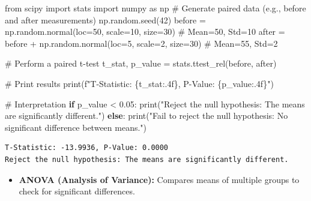 \documentclass[
  letterpaper,
  DIV=11,
  numbers=noendperiod]{scrreprt}
\newenvironment{Shaded}{\begin{snugshade}}{\end{snugshade}}
\newcommand{\BuiltInTok}[1]{\textcolor[rgb]{0.00,0.23,0.31}{#1}}
\newcommand{\CommentTok}[1]{\textcolor[rgb]{0.37,0.37,0.37}{#1}}
\newcommand{\ControlFlowTok}[1]{\textcolor[rgb]{0.00,0.23,0.31}{\textbf{#1}}}
\newcommand{\DecValTok}[1]{\textcolor[rgb]{0.68,0.00,0.00}{#1}}
\newcommand{\FloatTok}[1]{\textcolor[rgb]{0.68,0.00,0.00}{#1}}
\newcommand{\ImportTok}[1]{\textcolor[rgb]{0.00,0.46,0.62}{#1}}
\newcommand{\NormalTok}[1]{\textcolor[rgb]{0.00,0.23,0.31}{#1}}
\newcommand{\OperatorTok}[1]{\textcolor[rgb]{0.37,0.37,0.37}{#1}}
\newcommand{\SpecialCharTok}[1]{\textcolor[rgb]{0.37,0.37,0.37}{#1}}
\newcommand{\SpecialStringTok}[1]{\textcolor[rgb]{0.13,0.47,0.30}{#1}}
\newcommand{\StringTok}[1]{\textcolor[rgb]{0.13,0.47,0.30}{#1}}
\providecommand{\tightlist}{%
  \setlength{\itemsep}{0pt}\setlength{\parskip}{0pt}}\usepackage{longtable,booktabs,array}
\begin{document}
\begin{Shaded}
\begin{Highlighting}[]
\ImportTok{from}\NormalTok{ scipy }\ImportTok{import}\NormalTok{ stats}
\ImportTok{import}\NormalTok{ numpy }\ImportTok{as}\NormalTok{ np}
\CommentTok{\# Generate paired data (e.g., before and after measurements)}
\NormalTok{np.random.seed(}\DecValTok{42}\NormalTok{)}
\NormalTok{before }\OperatorTok{=}\NormalTok{ np.random.normal(loc}\OperatorTok{=}\DecValTok{50}\NormalTok{, scale}\OperatorTok{=}\DecValTok{10}\NormalTok{, size}\OperatorTok{=}\DecValTok{30}\NormalTok{)  }\CommentTok{\# Mean=50, Std=10}
\NormalTok{after }\OperatorTok{=}\NormalTok{ before }\OperatorTok{+}\NormalTok{ np.random.normal(loc}\OperatorTok{=}\DecValTok{5}\NormalTok{, scale}\OperatorTok{=}\DecValTok{2}\NormalTok{, size}\OperatorTok{=}\DecValTok{30}\NormalTok{)  }\CommentTok{\# Mean=55, Std=2}

\CommentTok{\# Perform a paired t{-}test}
\NormalTok{t\_stat, p\_value }\OperatorTok{=}\NormalTok{ stats.ttest\_rel(before, after)}

\CommentTok{\# Print results}
\BuiltInTok{print}\NormalTok{(}\SpecialStringTok{f"T{-}Statistic: }\SpecialCharTok{\{}\NormalTok{t\_stat}\SpecialCharTok{:.4f\}}\SpecialStringTok{, P{-}Value: }\SpecialCharTok{\{}\NormalTok{p\_value}\SpecialCharTok{:.4f\}}\SpecialStringTok{"}\NormalTok{)}

\CommentTok{\# Interpretation}
\ControlFlowTok{if}\NormalTok{ p\_value }\OperatorTok{\textless{}} \FloatTok{0.05}\NormalTok{:}
    \BuiltInTok{print}\NormalTok{(}\StringTok{"Reject the null hypothesis: The means are significantly different."}\NormalTok{)}
\ControlFlowTok{else}\NormalTok{:}
    \BuiltInTok{print}\NormalTok{(}\StringTok{"Fail to reject the null hypothesis: No significant difference between means."}\NormalTok{)}
\end{Highlighting}
\end{Shaded}

\begin{verbatim}
T-Statistic: -13.9936, P-Value: 0.0000
Reject the null hypothesis: The means are significantly different.
\end{verbatim}

\begin{itemize}
\tightlist
\item
  \textbf{ANOVA (Analysis of Variance):} Compares means of multiple
  groups to check for significant differences.
\end{itemize}
\end{document}

